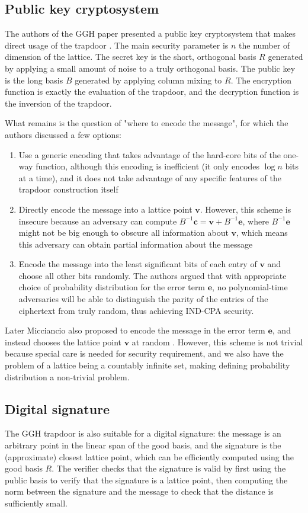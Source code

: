 \subsection{Public key cryptosystem}
The authors of the GGH paper presented a public key cryptosystem that makes direct usage of the trapdoor \cite{goldreich1997public}. The main security parameter is $n$ the number of dimension of the lattice. The secret key is the short, orthogonal basis $R$ generated by applying a small amount of noise to a truly orthogonal basis. The public key is the long basis $B$ generated by applying column mixing to $R$. The encryption function is exactly the evaluation of the trapdoor, and the decryption function is the inversion of the trapdoor.

What remains is the question of "where to encode the message", for which the authors discussed a few options:

\begin{enumerate}
    \item Use a generic encoding that takes advantage of the hard-core bits of the one-way function, although this encoding is inefficient (it only encodes $\log{n}$ bits at a time), and it does not take advantage of any specific features of the trapdoor construction itself
    \item Directly encode the message into a lattice point $\mathbf{v}$. However, this scheme is insecure because an adversary can compute $B^{-1}\mathbf{c} = \mathbf{v} + B^{-1}\mathbf{e}$, where $B^{-1}\mathbf{e}$ might not be big enough to obscure all information about $\mathbf{v}$, which means this adversary can obtain partial information about the message
    \item Encode the message into the least significant bits of each entry of $\mathbf{v}$ and choose all other bits randomly. The authors argued that with appropriate choice of probability distribution for the error term $\mathbf{e}$, no polynomial-time adversaries will be able to distinguish the parity of the entries of the ciphertext from truly random, thus achieving IND-CPA security.
\end{enumerate}

Later Micciancio also proposed to encode the message in the error term $\mathbf{e}$, and instead chooses the lattice point $\mathbf{v}$ at random \cite{micciancio2001improving}. However, this scheme is not trivial because special care is needed for security requirement, and we also have the problem of a lattice being a countably infinite set, making defining probability distribution a non-trivial problem.

\subsection{Digital signature}
The GGH trapdoor is also suitable for a digital signature: the message is an arbitrary point in the linear span of the good basis, and the signature is the (approximate) closest lattice point, which can be efficiently computed using the good basis $R$. The verifier checks that the signature is valid by first using the public basis to verify that the signature is a lattice point, then computing the norm between the signature and the message to check that the distance is sufficiently small.